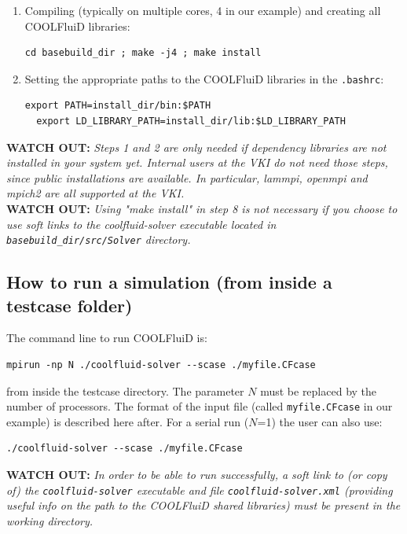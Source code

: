 \documentclass[11pt]{article}
\begin{document}
\begin{enumerate}
\item 
  Compiling (typically on multiple cores, 4 in our example) and creating all COOLFluiD libraries:
\begin{lstlisting}[breaklines]
cd basebuild_dir ; make -j4 ; make install
\end{lstlisting}
\item 
  Setting the appropriate paths to the COOLFluiD libraries in the \texttt{.bashrc}:
\begin{lstlisting}[breaklines]
  export PATH=install_dir/bin:$PATH
  export LD_LIBRARY_PATH=install_dir/lib:$LD_LIBRARY_PATH
\end{lstlisting}  
\end{enumerate}

{\bf WATCH OUT:} {\it Steps 1 and 2 are only needed if dependency libraries are not installed in your system yet. Internal users at the VKI do not need those steps, since public installations are available. In particular, lammpi, openmpi and mpich2 are all supported at the VKI.
}  \\

{\bf WATCH OUT:} {\it Using "make install" in step 8 is not necessary if you choose to use soft links to the coolfluid-solver executable located in
  \texttt{basebuild\_dir/src/Solver} directory.  
}

\subsection{How to run a simulation (from inside a testcase folder)}

The command line to run COOLFluiD is: 

\begin{lstlisting}[breaklines]
mpirun -np N ./coolfluid-solver --scase ./myfile.CFcase
\end{lstlisting}
from inside the testcase directory. The parameter $N$ must be replaced by the number of 
processors. The format of the input file (called {\tt myfile.CFcase} in our example) is described here after.
For a serial run ($N$=1) the user can also use:

\begin{lstlisting}[breaklines]
./coolfluid-solver --scase ./myfile.CFcase
\end{lstlisting}

{\bf WATCH OUT:} {\it In order to be able to run successfully, a soft link to (or copy of) the {\tt coolfluid-solver} executable and file {\tt coolfluid-solver.xml} (providing useful info on the path to the COOLFluiD shared libraries) must be present in the working directory.}
 
\end{document}

